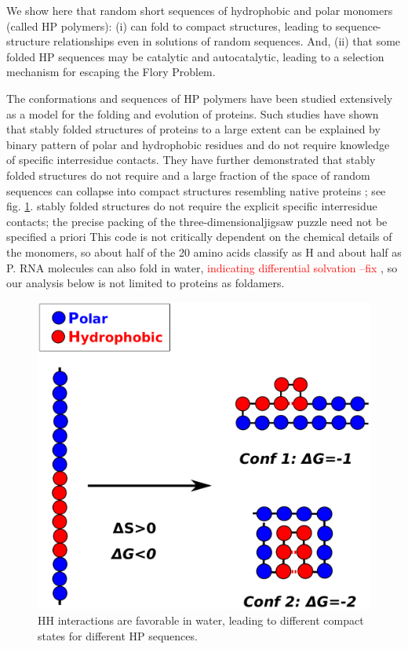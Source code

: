 \documentclass[journal=jacsat,manuscript=article,layout=twocolumn]{achemso}
\newcommand*{\red}[1]{\textcolor{red}{#1}}
\begin{document}
We show here that random short sequences of hydrophobic and polar monomers (called HP polymers): (i) 
can fold to compact structures, leading to sequence-structure relationships even in solutions of 
random sequences.  And, (ii) that some folded HP sequences may be catalytic and autocatalytic, 
leading to a selection mechanism for escaping the Flory Problem.  

The conformations and sequences of HP polymers have been studied extensively as a model for the 
folding and evolution of 
proteins\cite{lau1989lattice,Chan1991,Miller1995,Yue1995,agarwala1997local}.  Such studies have 
shown that stably folded structures of proteins to a large extent can be 
explained by binary pattern of polar and hydrophobic residues and do not require knowledge of 
specific interresidue contacts\cite{Yue1992,Xiong1995,Fisher2011}. They have 
further demonstrated that stably folded structures do not require 
 and a large fraction of the space of random sequences can 
collapse into compact structures resembling native proteins  \cite{}; see fig. 
\ref{fig:hydro-effect}.   stably folded structures do not require the explicit specific interresidue 
contacts; the
precise packing of the three-dimensionaljigsaw puzzle need not be specified a priori
This code is not critically dependent on the chemical details of the 
monomers, so about half of the 20 amino acids classify as H and about half as P.  RNA molecules can 
also fold in water, \red{indicating differential solvation --fix }, so our analysis below is not 
limited to proteins as foldamers.

\begin{figure}[h!]
  \centering
  \includegraphics[width=\columnwidth]{pictures/hp-model.pdf} 
  \caption{HH interactions are favorable in water, leading to different compact states for different 
HP sequences.}
  \label{fig:hydro-effect}
\end{figure}
\end{document}
